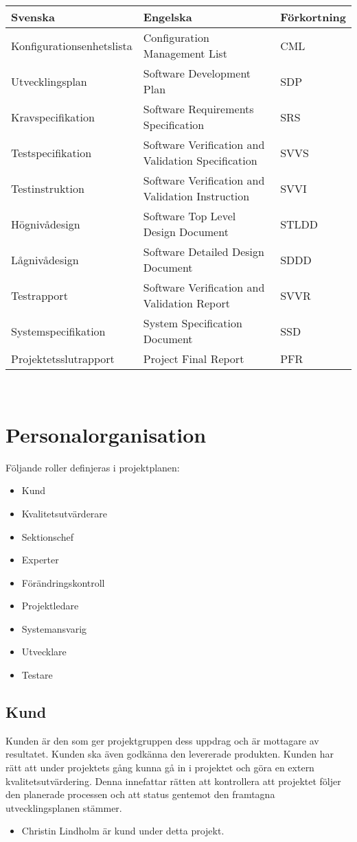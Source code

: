 \documentclass[paper=a4, fontsize=11pt,twoside]{article}
\begin{document}
\begin{tabular}{| l | l | l |}
\hline
\textbf{Svenska} & \textbf{Engelska} & \textbf{Förkortning} \\
\hline
\hline
 Konfigurationsenhetslista & Configuration Management List & CML \\
 \hline
Utvecklingsplan	 & Software Development Plan & SDP \\
\hline
Kravspecifikation & Software Requirements Specification & SRS \\
\hline
Testspecifikation & Software Verification and Validation Specification & SVVS \\
\hline
Testinstruktion & Software Verification and Validation Instruction & SVVI \\
\hline
Högnivådesign & Software Top Level Design Document & STLDD \\
\hline
Lågnivådesign & Software Detailed Design Document & SDDD \\
\hline
Testrapport & Software Verification and Validation Report & SVVR \\
\hline
Systemspecifikation & System Specification Document & SSD \\
\hline
Projektetsslutrapport & Project Final Report & PFR \\
\hline
\end{tabular}\\

\section{Personalorganisation}
{\color{red}{NOTERA: Nämda dokument i nedanstående text kan ersättas med sina koder när dokumenttabellen i stycket ovan är klart}}
Följande roller definjeras i projektplanen: 
\begin{itemize}
\item Kund
\item Kvalitetsutvärderare
\item Sektionschef
\item Experter
\item Förändringskontroll
\item Projektledare
\item Systemansvarig
\item Utvecklare
\item Testare
\end{itemize}

\subsection*{Kund}
Kunden är den som ger projektgruppen dess uppdrag och är mottagare av resultatet. Kunden ska även godkänna den levererade produkten. Kunden har rätt att under projektets gång kunna gå in i projektet och göra en extern kvalitetsutvärdering. Denna innefattar rätten att kontrollera att projektet följer den planerade processen och att status gentemot den framtagna utvecklingsplanen stämmer. 
\begin{itemize}
\item Christin Lindholm är kund under detta projekt. 
\end{itemize}
\end{document}
